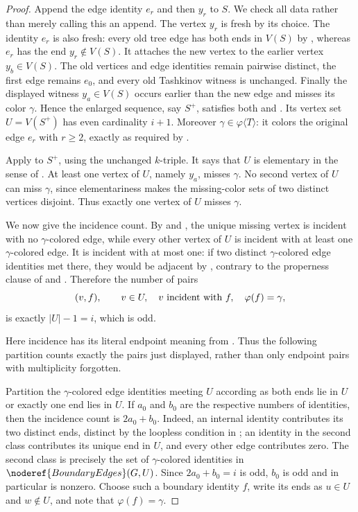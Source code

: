 \begin{proof}
Append the edge identity $e_r$ and then $y_r$ to $S$.  We check all data
rather than merely calling this an append.  The vertex $y_r$ is fresh by
its choice.  The identity $e_r$ is also fresh: every old tree edge has
both ends in $V(S)$ by , whereas $e_r$ has the end
$y_r\notin V(S)$.  It attaches the new vertex to the earlier vertex
$y_b\in V(S)$.  The old vertices and edge identities remain pairwise
distinct, the first edge remains $e_0$, and every old Tashkinov witness is
unchanged.  Finally the displayed witness $y_a\in V(S)$ occurs earlier
than the new edge and misses its color $\gamma$.  Hence the enlarged
sequence, say $S^+$, satisfies both  and
.  Its vertex set $U=V(S^+)$ has even cardinality
$i+1$.  Moreover $\gamma\in\varphi\langle T\rangle$: it colors the
original edge $e_r$ with $r\geq2$, exactly as required by
.

Apply  to $S^+$, using the unchanged $k$-triple.  It
says that $U$ is elementary in the sense of
.  At least one vertex of $U$, namely
$y_a$, misses $\gamma$.  No second vertex of $U$ can miss $\gamma$, since
elementariness makes the missing-color sets of two distinct vertices
disjoint.  Thus exactly one vertex of $U$ misses $\gamma$.

We now give the incidence count.  By  and
, the unique missing vertex is incident with no
$\gamma$-colored edge, while every other vertex of $U$ is incident with at
least one $\gamma$-colored edge.  It is incident with at most one: if two
distinct $\gamma$-colored edge identities met there, they would be
adjacent by , contrary to the properness clause of
 and .  Therefore the
number of pairs
\[
 (v,f),\qquad v\in U,\quad v\hbox{ incident with }f,
 \quad\varphi(f)=\gamma,
\]
is exactly $|U|-1=i$, which is odd.

Here incidence has its literal endpoint meaning from
.  Thus the following partition counts exactly the
pairs just displayed, rather than only endpoint pairs with multiplicity
forgotten.

Partition the $\gamma$-colored edge identities meeting $U$ according as
both ends lie in $U$ or exactly one end lies in $U$.  If $a_0$ and $b_0$
are the respective numbers of identities, then the incidence count is
$2a_0+b_0$.  Indeed, an internal identity contributes its two distinct
ends, distinct by the loopless condition in
; an identity in the second class contributes
its unique end in $U$, and every other edge contributes zero.  The second
class is precisely the set of $\gamma$-colored identities in
$\noderef{BoundaryEdges}(G,U)$.  Since $2a_0+b_0=i$ is odd, $b_0$ is odd
and in particular is nonzero.  Choose such a boundary identity $f$, write
its ends as $u\in U$ and $w\notin U$, and note that
$\varphi(f)=\gamma$.


\end{proof}
